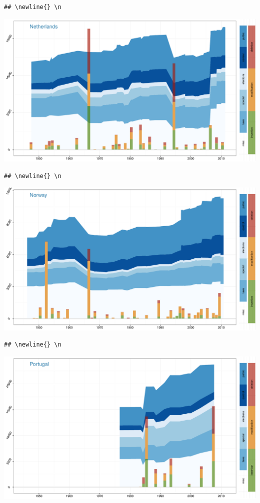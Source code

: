 \documentclass[a4paper, landscape]{article}
\begin{document}
\begin{verbatim}
## \newline{} \n
\end{verbatim}

\includegraphics{country_graphs_files/figure-latex/unnamed-chunk-3-13.pdf}\\

\begin{verbatim}
## \newline{} \n
\end{verbatim}

\includegraphics{country_graphs_files/figure-latex/unnamed-chunk-3-14.pdf}\\

\begin{verbatim}
## \newline{} \n
\end{verbatim}

\includegraphics{country_graphs_files/figure-latex/unnamed-chunk-3-15.pdf}\\
\end{document}
